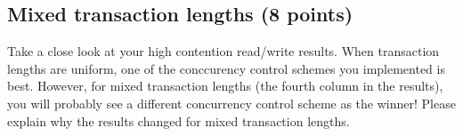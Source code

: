 \documentclass[11pt]{article}
\newcommand{\answer}[1]{}
\newcommand{\answer}[1]{{\color{black}\texttt{{a: - #1}}}}
\begin{document}
\subsection{Mixed transaction lengths (8 points)}

Take a close look at your high contention read/write results. When transaction lengths are uniform, one of the conccurency control schemes you implemented is best. However, for mixed transaction lengths (the fourth column in the results), you will probably see a different concurrency control scheme as the winner! Please explain why the results changed for mixed transaction lengths.

\answer{your answer here...}
\vspace{10mm}
\end{document}
